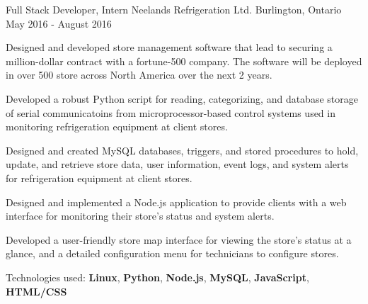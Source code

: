 \begin{cventries}
  \cventry
    {Full Stack Developer, Intern}
    {Neelands Refrigeration Ltd.}
    {Burlington, Ontario}
    {May 2016 - August 2016}
    {
      \begin{cvitems}
        \item {Designed and developed store management software that lead to securing a million-dollar contract with a fortune-500 company. The software will be deployed in over 500 store across North America over the next 2 years.}
        \item {Developed a robust Python script for reading, categorizing, and database storage of serial communicatoins from microprocessor-based control systems used in monitoring refrigeration equipment at client stores.}
        \item {Designed and created MySQL databases, triggers, and stored procedures to hold, update, and retrieve store data, user information, event logs, and system alerts for refrigeration equipment at client stores.}
        \item {Designed and implemented a Node.js application to provide clients with a web interface for monitoring their store's status and system alerts.}
        \item {Developed a user-friendly store map interface for viewing the store's status at a glance, and a detailed configuration menu for technicians to configure stores.}
        \item {Technologies used: \textbf{Linux}, \textbf{Python}, \textbf{Node.js}, \textbf{MySQL}, \textbf{JavaScript}, \textbf{HTML/CSS}}
      \end{cvitems}
    }
  
\end{cventries}

